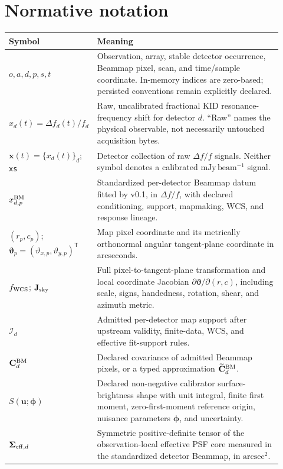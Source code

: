 \section{Normative notation}
\label{sec:notation}
\small
\begin{longtable}{L{0.22\linewidth}L{0.70\linewidth}}
\toprule
Symbol & Meaning \\
\midrule
$o,a,d,p,s,t$ & Observation, array, stable detector occurrence, Beammap pixel, scan, and time/sample coordinate. In-memory indices are zero-based; persisted conventions remain explicitly declared. \\
$x_d(t)=\Delta f_d(t)/f_d$ & Raw, uncalibrated fractional KID resonance-frequency shift for detector $d$. ``Raw'' names the physical observable, not necessarily untouched acquisition bytes. \\
$\mathbf x(t)=\{x_d(t)\}_d$; \texttt{xs} & Detector collection of raw $\Delta f/f$ signals. Neither symbol denotes a calibrated $\mathrm{mJy\,beam^{-1}}$ signal. \\
$x^{\rm BM}_{d,p}$ & Standardized per-detector Beammap datum fitted by v0.1, in $\Delta f/f$, with declared conditioning, support, mapmaking, WCS, and response lineage. \\
$(r_p,c_p)$; $\boldsymbol\vartheta_p=(\vartheta_{x,p},\vartheta_{y,p})^\mathsf T$ & Map pixel coordinate and its metrically orthonormal angular tangent-plane coordinate in arcseconds. \\
$f_{\rm WCS}$; $\mathbf J_{\rm sky}$ & Full pixel-to-tangent-plane transformation and local coordinate Jacobian $\partial\boldsymbol\vartheta/\partial(r,c)$, including scale, signs, handedness, rotation, shear, and azimuth metric. \\
$\mathcal I_d$ & Admitted per-detector map support after upstream validity, finite-data, WCS, and effective fit-support rules. \\
$\mathbf C^{\rm BM}_d$ & Declared covariance of admitted Beammap pixels, or a typed approximation $\widetilde{\mathbf C}^{\rm BM}_d$. \\
$S(\mathbf u;\boldsymbol\phi)$ & Declared non-negative calibrator surface-brightness shape with unit integral, finite first moment, zero-first-moment reference origin, nuisance parameters $\boldsymbol\phi$, and uncertainty. \\
$\boldsymbol\Sigma_{{\rm eff},d}$ & Symmetric positive-definite tensor of the observation-local effective PSF core measured in the standardized detector Beammap, in $\mathrm{arcsec^2}$. \\

\end{longtable}
